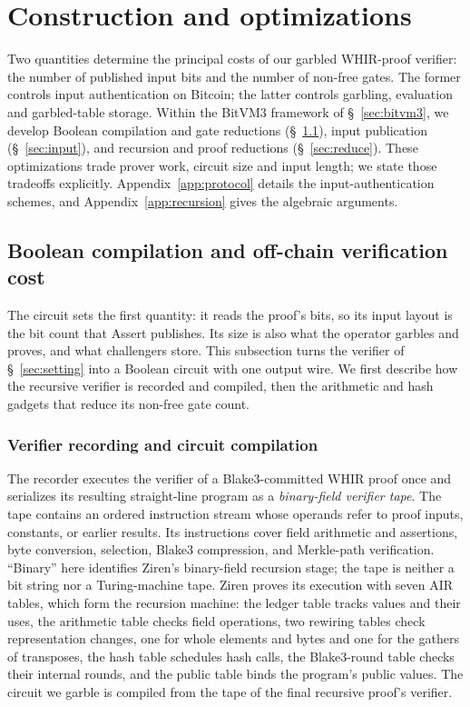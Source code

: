\documentclass[11pt]{article}
\begin{document}
\section{Construction and optimizations}\label{sec:protocol}

Two quantities determine the principal costs of our garbled WHIR-proof
verifier: the number of published input bits and the number of non-free gates. The former
controls input authentication on Bitcoin; the latter controls garbling,
evaluation and garbled-table storage. Within the BitVM3 framework of
\S~\ref{sec:bitvm3}, we develop Boolean compilation and gate reductions
(\S~\ref{sec:construction}), input publication (\S~\ref{sec:input}), and
recursion and proof reductions (\S~\ref{sec:reduce}). These optimizations
trade prover work, circuit size and input length; we state those tradeoffs
explicitly. Appendix~\ref{app:protocol} details the input-authentication schemes,
and Appendix~\ref{app:recursion} gives the algebraic arguments.

\subsection{Boolean compilation and off-chain verification cost}\label{sec:construction}

The circuit sets the first quantity: it reads the proof's bits, so its input
layout is the bit count that Assert publishes. Its size is also what
the operator garbles and proves, and what challengers store. This subsection turns the
verifier of \S~\ref{sec:setting} into a Boolean circuit with one output wire.
We first describe how the recursive verifier is recorded and compiled, then
the arithmetic and hash gadgets that reduce its non-free gate count.

\subsubsection{Verifier recording and circuit compilation}\label{sec:tape}

The recorder executes the verifier of a Blake3-committed WHIR proof once and
serializes its resulting straight-line program as a \emph{binary-field
verifier tape}. The tape contains an ordered instruction stream whose
operands refer to proof inputs, constants, or earlier results. Its
instructions cover field arithmetic and assertions, byte conversion,
selection, Blake3 compression, and Merkle-path verification. ``Binary'' here
identifies Ziren's binary-field recursion stage; the tape is neither a bit
string nor a Turing-machine tape. Ziren proves its execution with seven AIR
tables, which form the recursion machine: the ledger table tracks values and their uses, the arithmetic table checks
field operations, two rewiring tables check representation changes, one for
whole elements and bytes and one for the gathers of transposes, the hash
table schedules hash calls, the Blake3-round table checks their internal
rounds, and the public table binds the program's public values. The circuit
we garble is compiled from the tape of the final recursive proof's verifier.
\end{document}
